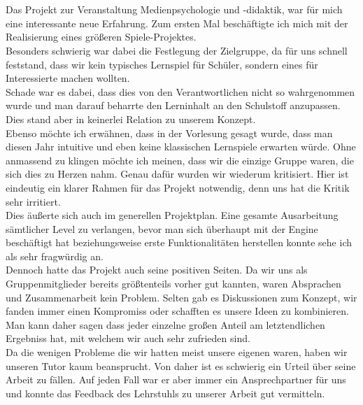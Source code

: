 \documentclass[10pt,a4paper,notitlepage]{report}
\begin{document}
	\\\par\medskip\Text
	\\\par\medskip\Text
	Das Projekt zur Veranstaltung Medienpsychologie und -didaktik, war für mich eine interessante neue Erfahrung. Zum ersten Mal beschäftigte ich mich mit der Realisierung eines größeren Spiele-Projektes. \\
	Besonders schwierig war dabei die Festlegung der Zielgruppe, da für uns schnell feststand, dass wir kein typisches Lernspiel für Schüler, sondern eines für Interessierte machen wollten.\\
	Schade war es dabei, dass dies von den Verantwortlichen nicht so wahrgenommen wurde und man darauf beharrte den Lerninhalt an den Schulstoff anzupassen. Dies stand aber in keinerlei Relation zu unserem Konzept.\\
	Ebenso möchte ich erwähnen, dass in der Vorlesung gesagt wurde, dass man diesen Jahr intuitive und eben keine klassischen Lernspiele erwarten würde. Ohne anmassend zu klingen möchte ich meinen, dass wir die einzige Gruppe waren, die sich dies zu 	Herzen nahm. Genau dafür wurden wir wiederum kritisiert. Hier ist eindeutig ein klarer Rahmen für das Projekt notwendig, denn uns hat die Kritik sehr irritiert.\\
	Dies äußerte sich auch im generellen Projektplan. Eine gesamte Ausarbeitung sämtlicher Level zu verlangen, bevor man sich überhaupt mit der Engine beschäftigt hat beziehungsweise erste Funktionalitäten herstellen konnte sehe ich als sehr fragwürdig an.\\
	Dennoch hatte das Projekt auch seine positiven Seiten. Da wir uns als Gruppenmitglieder bereits größtenteils vorher gut kannten, waren Absprachen und Zusammenarbeit kein Problem. Selten gab es Diskussionen zum Konzept, wir fanden immer einen Kompromiss oder schafften es unsere Ideen zu kombinieren. Man kann daher sagen dass jeder einzelne großen Anteil am 	letztendlichen Ergebniss hat, mit welchem wir auch sehr zufrieden sind.\\
	Da die wenigen Probleme die wir hatten meist unsere eigenen waren, haben wir unseren Tutor kaum beansprucht. Von daher ist es schwierig ein Urteil über seine Arbeit zu fällen. Auf jeden Fall war er aber immer ein Ansprechpartner für uns und konnte das Feedback des Lehrstuhls zu unserer Arbeit gut vermitteln.\\\par\smallskip
\end{document}
